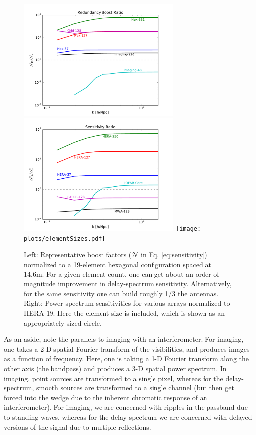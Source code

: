 \documentclass[preprint,11pt]{aastex}
\begin{document}
\begin{figure}[h!]
\centerline{
\includegraphics[height=6cm]{plots/boost.pdf}
\includegraphics[height=6cm]{plots/sensratio.pdf}
\texttt{[image: plots/elementSizes.pdf]}
}
\caption{Left: Representative boost factors ($\mathcal{N}$ in Eq. \ref{eq:sensitivity}) normalized to a 19-element hexagonal configuration spaced at 14.6m.  For a given element count, one can get about an order of
magnitude improvement in delay-spectrum sensitivity.  Alternatively, for the same sensitivity one can build roughly 1/3 the antennas.  Right:  Power spectrum sensitivities for various arrays normalized to HERA-19.  Here the element size is included, which is shown as an appropriately sized circle.}
\label{fig:boost}
\end{figure}



As an aside, note the parallels to imaging with an interferometer.  For imaging, one takes a 2-D spatial Fourier transform of the visibilities, and produces images as a function of frequency.  Here, one is taking a 1-D Fourier transform along the other axis (the bandpass) and produces a 3-D spatial power spectrum.  In imaging, point sources are transformed to a single pixel, whereas for the delay-spectrum, smooth sources are transformed to a single channel (but then get forced into the wedge due to the inherent chromatic response of an interferometer).  For imaging, we are concerned with ripples in the passband due to standing waves, whereas for the delay-spectrum we are concerned with delayed versions of the signal due to multiple reflections.
\end{document}
